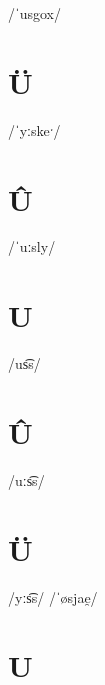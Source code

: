 \documentclass[10pt,a4paper,twoside]{book}
\begin{document}
\begin{multicols}{3}
 {/ˈusgox/} {}
\end{multicols}

\section*{Ü}

\begin{multicols}{3}
 {/ˈyːskeˑ/} {}
\end{multicols}

\section*{Û}

\begin{multicols}{3}
 {/ˈuːsly/} {}
\end{multicols}

\section*{U}

\begin{multicols}{3}
 {/us͡s/} {}
\end{multicols}

\section*{Û}

\begin{multicols}{3}
 {/uːs͡s/} {}
\end{multicols}

\section*{Ü}

\begin{multicols}{3}
 {/yːs͡s/} {}
 {/ˈøsjae̯/} {}
\end{multicols}

\section*{U}
\end{document}
